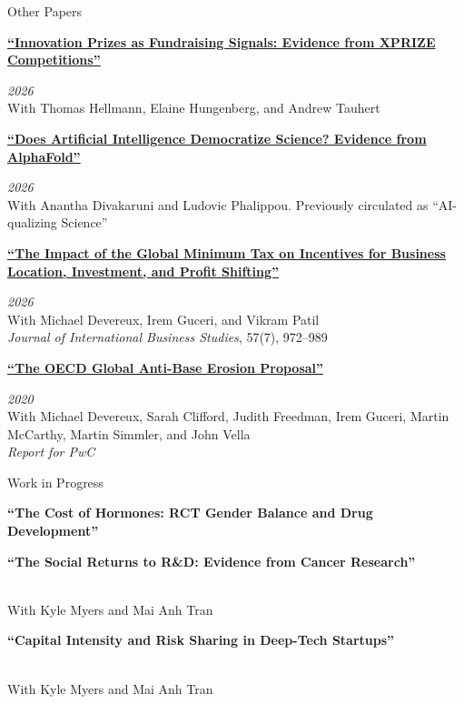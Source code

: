 \documentclass{resume} %
\begin{document}
\begin{rSection}{Other Papers}

\parbox[t]{0.82\linewidth}{\textbf{\href{https://fbares.github.io/assets/papers/innovation-prizes-as-fundraising-signals.pdf}{``Innovation Prizes as Fundraising Signals: Evidence from XPRIZE Competitions''}}} \hfill {\em 2026} \\
With Thomas Hellmann, Elaine Hungenberg, and Andrew Tauhert

\item \parbox[t]{0.82\linewidth}{\textbf{\href{https://fbares.github.io/assets/papers/does-ai-democratize-science.pdf}{``Does Artificial Intelligence Democratize Science? Evidence from AlphaFold''}}} \hfill {\em 2026} \\
With Anantha Divakaruni and Ludovic Phalippou. Previously circulated as ``AI-qualizing Science''

\item \parbox[t]{0.82\linewidth}{\textbf{\href{https://link.springer.com/article/10.1057/s41267-026-00860-z}{``The Impact of the Global Minimum Tax on Incentives for Business Location, Investment, and Profit Shifting''}}} \hfill {\em 2026} \\
With Michael Devereux, Irem Guceri, and Vikram Patil \\
\textit{Journal of International Business Studies}, 57(7), 972--989

\item \parbox[t]{0.82\linewidth}{\textbf{\href{https://www.sbs.ox.ac.uk/sites/default/files/2020-02/OECD_GloBE_proposal_report_2020.pdf}{``The OECD Global Anti-Base Erosion Proposal''}}} \hfill {\em 2020} \\
With Michael Devereux, Sarah Clifford, Judith Freedman, Irem Guceri, Martin McCarthy, Martin Simmler, and John Vella \\
\textit{Report for PwC}

\end{rSection}


\begin{rSection}{Work in Progress}

\parbox[t]{0.82\linewidth}{\textbf{``The Cost of Hormones: RCT Gender Balance and Drug Development''}}

\item \parbox[t]{0.82\linewidth}{\textbf{``The Social Returns to R\&D: Evidence from Cancer Research''}} \hfill \\
With Kyle Myers and Mai Anh Tran

\item \parbox[t]{0.82\linewidth}{\textbf{``Capital Intensity and Risk Sharing in Deep-Tech Startups''}} \hfill \\
With Kyle Myers and Mai Anh Tran

\end{rSection}
\end{document}
